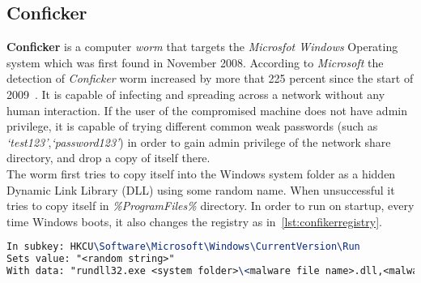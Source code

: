 \subsection{Conficker}
\label{sub:Conficker}
\textbf{Conficker} is a computer \emph{worm} that targets the \emph{Microsfot Windows} Operating system which was first found in November 2008.
According to \emph{Microsoft} the detection of \emph{Conficker} worm increased by more that 225 percent since the start of 2009~\cite[]{conficker}.
It is capable of infecting and spreading across a network without any human interaction.
If the user of the compromised machine does not have admin privilege, it is capable of trying different common weak passwords (such as \emph{`test123'},\emph{`password123'}) in order to gain admin privilege of the network share directory, and drop a copy of itself there.\\
The worm first tries to copy itself into the Windows system folder as a hidden Dynamic Link Library (DLL) using some random name. When unsuccessful it tries to copy itself in \emph{\%ProgramFiles\%} directory.
In order to run on startup, every time Windows boots, it also changes the registry as in~\autoref{lst:confikerregistry}.
\begin{lstlisting}[numbers=none,language=TeX,caption={Registry key created by Confiker worm for autostart},label={lst:confikerregistry}]
In subkey: HKCU\Software\Microsoft\Windows\CurrentVersion\Run
Sets value: "<random string>"
With data: "rundll32.exe <system folder>\<malware file name>.dll,<malware parameters>"
\end{lstlisting}
